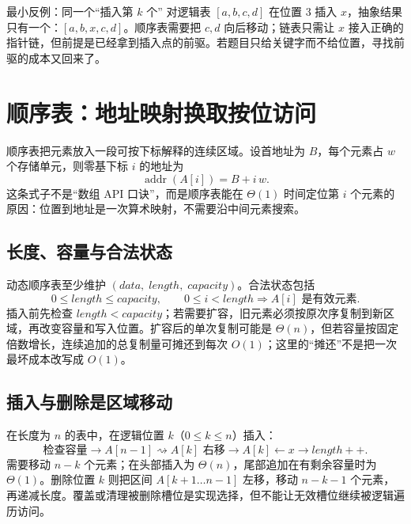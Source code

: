 \documentclass[UTF8,fontset=none,11pt,a4paper]{ctexart}
\begin{document}
\begin{examplebox}{最小反例：同一个“插入第 $k$ 个”}
对逻辑表 $[a,b,c,d]$ 在位置 $3$ 插入 $x$，抽象结果只有一个：$[a,b,x,c,d]$。顺序表需要把 $c,d$ 向后移动；链表只需让 $x$ 接入正确的指针链，但前提是已经拿到插入点的前驱。若题目只给关键字而不给位置，寻找前驱的成本又回来了。
\end{examplebox}

\section{顺序表：地址映射换取按位访问}
顺序表把元素放入一段可按下标解释的连续区域。设首地址为 $B$，每个元素占 $w$ 个存储单元，则零基下标 $i$ 的地址为
\[
\operatorname{addr}(A[i])=B+i\,w.
\]
这条式子不是“数组 API 口诀”，而是顺序表能在 $\Theta(1)$ 时间定位第 $i$ 个元素的原因：位置到地址是一次算术映射，不需要沿中间元素搜索。

\subsection{长度、容量与合法状态}
动态顺序表至少维护 $(data,\;length,\;capacity)$。合法状态包括
\[
0\le length\le capacity,\qquad 0\le i<length\Rightarrow A[i]\text{ 是有效元素}.
\]
插入前先检查 $length<capacity$；若需要扩容，旧元素必须按原次序复制到新区域，再改变容量和写入位置。扩容后的单次复制可能是 $\Theta(n)$，但若容量按固定倍数增长，连续追加的总复制量可摊还到每次 $O(1)$；这里的“摊还”不是把一次最坏成本改写成 $O(1)$。

\subsection{插入与删除是区域移动}
在长度为 $n$ 的表中，在逻辑位置 $k$（$0\le k\le n$）插入：
\[
\text{检查容量}\to A[n-1]\rightsquigarrow A[k]\text{ 右移}\to A[k]\leftarrow x\to length{+}{+}.
\]
需要移动 $n-k$ 个元素；在头部插入为 $\Theta(n)$，尾部追加在有剩余容量时为 $\Theta(1)$。删除位置 $k$ 则把区间 $A[k+1\ldots n-1]$ 左移，移动 $n-k-1$ 个元素，再递减长度。覆盖或清理被删除槽位是实现选择，但不能让无效槽位继续被逻辑遍历访问。

\begin{center}
\end{center}
\end{document}
